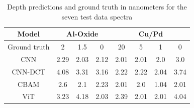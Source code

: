 \begin{table}[H]
    \centering
    \begin{tabular}{c|c|c|c|c|c|c|c}
        Model  &    \multicolumn{3}{|c|}{Al-Oxide}     & \multicolumn{4}{c}{Cu/Pd}            \\
        \hline
Ground truth   &       2   &   1.5   &  0   & 20   & 5    & 1     & 0                               \\
\hline
CNN            &    2.29   &  2.03  & 2.12  & 2.01  &  2.01 & 2.0   & 3.0                                \\
CNN-DCT        &    4.08   &  3.31  & 3.16  & 2.22 &  2.22 & 2.04  & 3.74                                 \\
CBAM           &    2.6    &  2.1   & 2.23  & 2.01 &  2.0  & 1.04  & 2.01                                \\
ViT            &    3.23   &  4.18  & 2.03  & 2.39 &  2.01 & 2.01  & 4.04                               \\

    \end{tabular}
    \caption{Depth predictions and ground truth in nanometers for the seven test data spectra}
    \label{tab:acc_depth}
\end{table}
